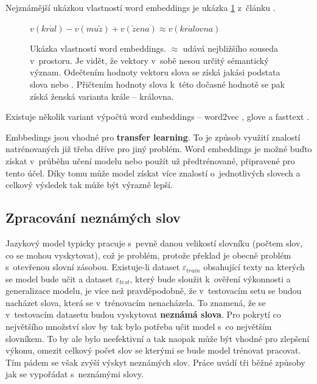 Nejznámější ukázkou vlastností word embeddings je ukázka \ref{figure:kingQueen} z~článku \cite{kingQueen}.


\begin{figure}[H]
    \begin{center}
        $
          v(kr\acute{a}l) - v(mu\check{z}) + v(\check{z}ena) \approx v(kr\acute{a}lovna)
        $
    \end{center}
	\caption{Ukázka vlastností word embeddings. $\approx$ udává nejbližšího souseda v~prostoru. Je vidět, že vektory v~sobě nesou určitý sémantický význam. Odečtením hodnoty vektoru slova  se získá jakási podstata slova  nebo . Přičtením hodnoty slova  k~této dočasné hodnotě se pak získá ženská varianta krále -- královna.}
	\label{figure:kingQueen}
\end{figure}


Existuje několik variant výpočtů word embeddings -- word2vec \cite{word2vec}, glove \cite{glove} a fasttext \cite{fasttext}.


Embbedings jsou vhodné pro \textbf{transfer learning}. To je způsob využití znalostí natrénovaných již třeba dříve pro jiný problém. Word embeddings je možné buďto získat v~průběhu učení modelu nebo použít už předtrénované, připravené pro tento účel. Díky tomu může model získat více znalostí o~jednotlivých slovech a celkový výsledek tak může být výrazně lepší.

\subsection{Zpracování neznámých slov} \label{subsection:oov}
Jazykový model typicky pracuje s~pevně danou velikostí slovníku (počtem slov, co se mohou vyskytovat), což je problém, protože překlad je obecně problém s~otevřenou slovní zásobou. Existuje-li dataset $\varepsilon_{train}$ obsahující texty na kterých se model bude učit a dataset $\varepsilon_{test}$, který bude sloužit k~ověření výkonnosti a generalizace modelu, je více než pravděpodobně, že v~testovacím setu se budou nacházet slova, která se v~trénovacím nenacházela. To znamená, že se v~testovacím datasetu budou vyskytovat \textbf{neznámá slova}. Pro pokrytí co největšího množství slov by tak bylo potřeba učit model s~co největším slovníkem. To by ale bylo neefektivní a tak naopak může být vhodné pro zlepšení výkonu, omezit celkový počet slov se kterými se bude model trénovat pracovat. Tím pádem se však zvýší výskyt neznámých slov. Práce \cite{nmtTutorial} uvádí tři běžné způsoby jak se vypořádat s~neznámými slovy.

